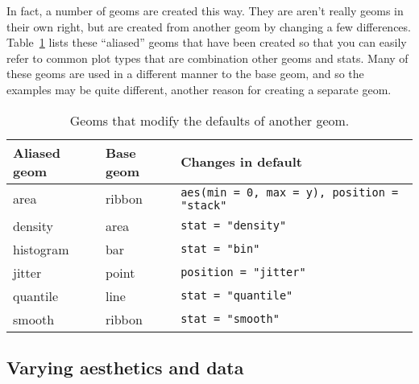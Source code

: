 % 


In fact, a number of geoms are created this way.  They are aren't really geoms in their own right, but are created from another geom by changing a few differences.  Table~\ref{tbl:aliased-geoms} lists these ``aliased'' geoms that have been created so that you can easily refer to common plot types that are combination other geoms and stats.  Many of these geoms are used in a different manner to the base geom, and so the examples may be quite different, another reason for creating a separate geom.  

\begin{table}
  \begin{center}
  \begin{tabular}{lll}
    \toprule
    Aliased geom & Base geom & Changes in default \\
    \midrule
    area      & ribbon & \verb!aes(min = 0, max = y), position = "stack"!  \\
    density   & area   & \verb!stat = "density"!    \\
    histogram & bar    & \verb!stat = "bin"!        \\
    jitter    & point  & \verb!position = "jitter"! \\
    quantile  & line   & \verb!stat = "quantile"!   \\
    smooth    & ribbon & \verb!stat = "smooth"!     \\
    \bottomrule
  \end{tabular}
  \end{center}
  \caption{Geoms that modify the defaults of another geom.}
  \label{tbl:aliased-geoms}
\end{table}

\subsection{Varying aesthetics and data}
\label{sub:different_aesthetics}

